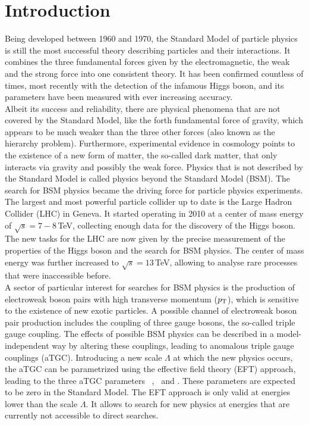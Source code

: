 \chapter*{Introduction}
Being developed between 1960 and 1970, the Standard Model of particle physics is still the most successful theory describing particles and their interactions. It combines the three fundamental forces given by the electromagnetic, the weak and the strong force into one consistent theory. It has been confirmed countless of times, most recently with the detection of the infamous Higgs boson, and its parameters have been measured with ever increasing accuracy.\\

Albeit its success and reliability, there are physical phenomena that are not covered by the Standard Model, like the forth fundamental force of gravity, which appears to be much weaker than the three other forces (also known as the hierarchy problem). Furthermore, experimental evidence in cosmology points to the existence of a new form of matter, the so-called dark matter, that only interacts via gravity and possibly the weak force. Physics that is not described by the Standard Model is called physics beyond the Standard Model (BSM). The search for BSM physics became the driving force for particle physics experiments.\\

The largest and most powerful particle collider up to date is the Large Hadron Collider (LHC) in Geneva. It started operating in 2010 at a center of mass energy of $\sqrt{s}=7-8$\,TeV, collecting enough data for the discovery of the Higgs boson. The new tasks for the LHC are now given by the precise measurement of the properties of the Higgs boson and the search for BSM physics. The center of mass energy was further increased to $\sqrt{s}=13$\,TeV, allowing to analyse rare processes that were inaccessible before.\\

A sector of particular interest for searches for BSM physics is the production of electroweak boson pairs with high transverse momentum ($p_{\rm T}$), which is sensitive to the existence of new exotic particles. A possible channel of electroweak boson pair production includes the coupling of three gauge bosons, the so-called triple gauge coupling. The effects of possible BSM physics can be described in a model-independent way by altering these couplings, leading to anomalous triple gauge couplings (aTGC). Introducing a new scale $\Lambda$ at which the new physics occurs, the aTGC can be parametrized using the effective field theory (EFT) approach, leading to the three aTGC parameters \Tcwww \ , \Tccw \ and \Tcb . These parameters are expected to be zero in the Standard Model. The EFT approach is only valid at energies lower than the scale $\Lambda$. It allows to search for new physics at energies that are currently not accessible to direct searches.\\

